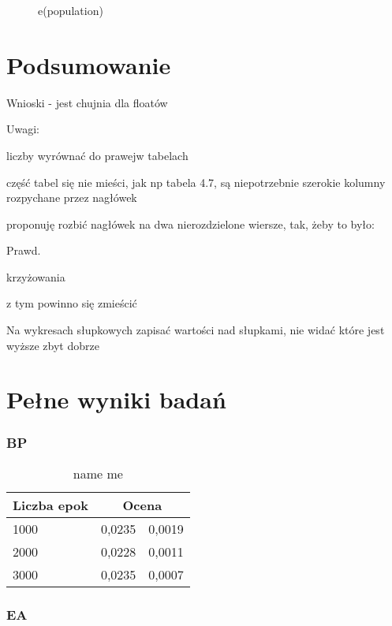 \documentclass[11pt,a4paper,oneside]{report}
\begin{document}
\begin{figure}[H]
	\caption{e(population)}
	
\end{figure}

\chapter{Podsumowanie}

Wnioski - jest chujnia dla floatów

Uwagi:

liczby wyrównać do prawejw tabelach

część tabel się nie mieści, jak np tabela 4.7, są niepotrzebnie szerokie kolumny rozpychane przez nagłówek

proponuję rozbić nagłówek na dwa nierozdzielone wiersze, tak, żeby to było:

Prawd.

krzyżowania

z tym powinno się zmieścić

Na wykresach słupkowych zapisać wartości nad słupkami, nie widać które jest wyższe zbyt dobrze




\appendix 
\chapter{Pełne wyniki badań}

\subsection{BP}

\begin{center}
	\begin{longtable}{|l|r@{$\pm$}r|}
		\caption{name me}\\
		\hline
		Liczba epok & \multicolumn{2}{|c|}{Ocena}\\ \hline \hline\endhead
		1000 & 0,0235 & 0,0019 \\ \hline
		2000 & 0,0228 & 0,0011\\ \hline
		3000 & 0,0235 & 0,0007\\ \hline
	\end{longtable}
\end{center}

\subsection{EA}
\end{document}
